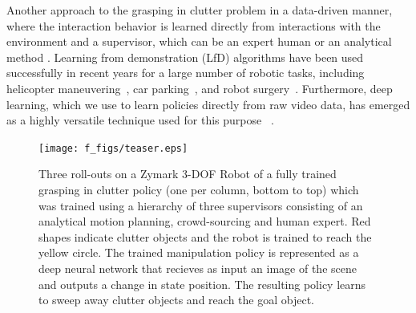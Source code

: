 \documentclass[10pt, conference]{ieeeconf}      %
\begin{document}
Another approach to the grasping in
clutter problem in a data-driven manner, where the interaction behavior is learned directly from interactions with the environment and a supervisor, which can be an expert human or an analytical method \cite{argall2009survey}. Learning from demonstration (LfD) algorithms have been used
successfully in recent years for a large number of robotic tasks, including helicopter
maneuvering~\cite{abbeel2007application}, car parking~\cite{abbeel2008apprenticeship},  and robot
surgery~\cite{van2010superhuman}. Furthermore, deep learning, which we use to learn policies directly from raw video
data, has emerged as a highly versatile technique used for this purpose ~\cite{pinto2015supersizing}.

\begin{figure}
\texttt{[image: f\_figs/teaser.eps]}
\caption{
Three roll-outs on a Zymark 3-DOF Robot of a fully trained grasping in clutter policy (one per column, bottom to top) which was trained using a
hierarchy of three supervisors consisting of an analytical motion planning, crowd-sourcing and human expert. 
Red shapes indicate clutter objects and the robot is trained to reach the yellow circle. The trained manipulation policy is represented as a deep neural network that recieves as input an image of the scene and outputs a change in state position. The resulting policy learns to sweep away clutter objects and reach the goal object. }
\vspace*{-20pt}
\label{fig:teaser}
\end{figure}

\end{document}
